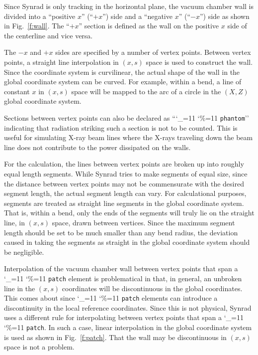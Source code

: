 \documentclass[11pt]{article}
\newcommand\ttcmd{\begingroup\catcode`\_=11 \catcode`\%=11 \dottcmd}
\newcommand\dottcmd[1]{\texttt{#1}\endgroup}
\newcommand{\vn}{\ttcmd}
\begin{document}
Since Synrad is only tracking in the horizontal plane, the vacuum
chamber wall is divided into a ``positive $x$'' (``$+x$'') side and a
``negative $x$'' (``$-x$'') side as shown in Fig.~\ref{f:wall}. The
``$+x$'' section is defined as the wall on the positive $x$ side of
the centerline and vice versa. 

The $-x$ and $+x$ sides are specified by a number of vertex
points. Between vertex points, a straight line interpolation in $(x,
s)$ space is used to construct the wall. Since the coordinate system
is curvilinear, the actual shape of the wall in the global coordinate
system can be curved. For example, within a bend, a line of constant
$x$ in $(x, s)$ space will be mapped to the arc of a circle in the
$(X, Z)$ global coordinate system.

Sections between vertex points can also be declared as
``\vn{phantom}'' indicating that radiation striking such a section is
not to be counted. This is useful for simulating X-ray beam lines
where the X-rays traveling down the beam line does not contribute to
the power dissipated on the walls.

For the calculation, the lines between vertex points are broken up
into roughly equal length segments. While Synrad tries to make
segments of equal size, since the distance between vertex points may
not be commensurate with the desired segment length, the actual
segment length can vary. For calculational purposes, segments are
treated as straight line segments in the global coordinate
system. That is, within a bend, only the ends of the segments will
truly lie on the straight line, in $(x, s)$ space, drawn between
vertices. Since the maximum segment length should be set to be much
smaller than any bend radius, the deviation caused in taking the
segments as straight in the global coordinate system should be
negligible.

Interpolation of the vacuum chamber wall between vertex points that
span a \vn{patch} element is problematical in that, in general, an
unbroken line in the $(x, s)$ coordinates will be discontinuous in the
global coordinates. This comes about since \vn{patch} elements can
introduce a discontinuity in the local reference coordinates. Since
this is not physical, Synrad uses a different rule for interpolating
between vertex points that span a \vn{patch}. In such a case, linear
interpolation in the global coordinate system is used as shown in
Fig.~\ref{f:patch}. That the wall may be discontinuous in $(x, s)$
space is not a problem.
\end{document}
